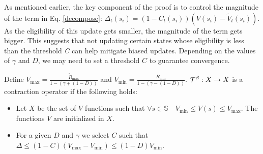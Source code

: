 As mentioned earlier, the key component of the proof is to control the magnitude of the term in Eq. \ref{decompose}: 
$\Delta_t(s_i) = (1-C_t(s_i))(V(s_i) - \widetilde{V}_t(s_i))$. As the eligibility of this update gets smaller, the magnitude of the term gets bigger. This suggests that not updating certain states whose eligibility is less than the threshold \emph{C} can help mitigate biased updates.
Depending on the values of $\gamma$ and $D$, we may need to set a threshold $C$ to guarantee convergence.
\begin{theorem}
\label{contraction_theorem}
Define $V_{\max} = \frac{\widetilde{R}_{\max}}{1-(\gamma+(1-D))}$ and $V_{\min} = \frac{R_{\min}}{1-(\gamma-(1-D))}$. $\mathcal{T}^{\beta}: X \rightarrow X$ is a contraction operator if the following holds:
\begin{itemize}
    \item Let $X$ be the set of $V$ functions such that $\forall s \in \mathbb{S} \quad  V_{\min} \leq V(s) \leq V_{\max}$.  The functions $V$ are initialized in $X$.
    \item For a given $D$ and $\gamma$ we select $C$ such that $\Delta \leq (1-C)(V_{\max}-V_{\min}) \leq (1-D)V_{\min}$.
\end{itemize}
\end{theorem}
